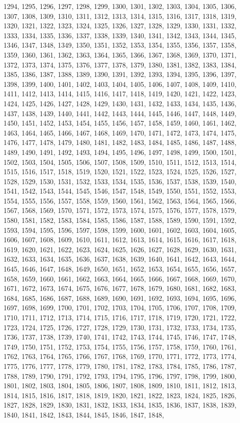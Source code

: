 \documentclass{article}
\begin{document}
{1294, 1295, 1296, 1297, 1298, 1299, 1300, 1301, 1302, 1303, 1304, 1305, 1306, 1307, 1308, 1309, 1310, 1311, 1312, 1313, 1314, 1315, 1316, 1317, 1318, 1319, 1320, 1321, 1322, 1323, 1324, 1325, 1326, 1327, 1328, 1329, 1330, 1331, 1332, 1333, 1334, 1335, 1336, 1337, 1338, 1339, 1340, 1341, 1342, 1343, 1344, 1345, 1346, 1347, 1348, 1349, 1350, 1351, 1352, 1353, 1354, 1355, 1356, 1357, 1358, 1359, 1360, 1361, 1362, 1363, 1364, 1365, 1366, 1367, 1368, 1369, 1370, 1371, 1372, 1373, 1374, 1375, 1376, 1377, 1378, 1379, 1380, 1381, 1382, 1383, 1384, 1385, 1386, 1387, 1388, 1389, 1390, 1391, 1392, 1393, 1394, 1395, 1396, 1397, 1398, 1399, 1400, 1401, 1402, 1403, 1404, 1405, 1406, 1407, 1408, 1409, 1410, 1411, 1412, 1413, 1414, 1415, 1416, 1417, 1418, 1419, 1420, 1421, 1422, 1423, 1424, 1425, 1426, 1427, 1428, 1429, 1430, 1431, 1432, 1433, 1434, 1435, 1436, 1437, 1438, 1439, 1440, 1441, 1442, 1443, 1444, 1445, 1446, 1447, 1448, 1449, 1450, 1451, 1452, 1453, 1454, 1455, 1456, 1457, 1458, 1459, 1460, 1461, 1462, 1463, 1464, 1465, 1466, 1467, 1468, 1469, 1470, 1471, 1472, 1473, 1474, 1475, 1476, 1477, 1478, 1479, 1480, 1481, 1482, 1483, 1484, 1485, 1486, 1487, 1488, 1489, 1490, 1491, 1492, 1493, 1494, 1495, 1496, 1497, 1498, 1499, 1500, 1501, 1502, 1503, 1504, 1505, 1506, 1507, 1508, 1509, 1510, 1511, 1512, 1513, 1514, 1515, 1516, 1517, 1518, 1519, 1520, 1521, 1522, 1523, 1524, 1525, 1526, 1527, 1528, 1529, 1530, 1531, 1532, 1533, 1534, 1535, 1536, 1537, 1538, 1539, 1540, 1541, 1542, 1543, 1544, 1545, 1546, 1547, 1548, 1549, 1550, 1551, 1552, 1553, 1554, 1555, 1556, 1557, 1558, 1559, 1560, 1561, 1562, 1563, 1564, 1565, 1566, 1567, 1568, 1569, 1570, 1571, 1572, 1573, 1574, 1575, 1576, 1577, 1578, 1579, 1580, 1581, 1582, 1583, 1584, 1585, 1586, 1587, 1588, 1589, 1590, 1591, 1592, 1593, 1594, 1595, 1596, 1597, 1598, 1599, 1600, 1601, 1602, 1603, 1604, 1605, 1606, 1607, 1608, 1609, 1610, 1611, 1612, 1613, 1614, 1615, 1616, 1617, 1618, 1619, 1620, 1621, 1622, 1623, 1624, 1625, 1626, 1627, 1628, 1629, 1630, 1631, 1632, 1633, 1634, 1635, 1636, 1637, 1638, 1639, 1640, 1641, 1642, 1643, 1644, 1645, 1646, 1647, 1648, 1649, 1650, 1651, 1652, 1653, 1654, 1655, 1656, 1657, 1658, 1659, 1660, 1661, 1662, 1663, 1664, 1665, 1666, 1667, 1668, 1669, 1670, 1671, 1672, 1673, 1674, 1675, 1676, 1677, 1678, 1679, 1680, 1681, 1682, 1683, 1684, 1685, 1686, 1687, 1688, 1689, 1690, 1691, 1692, 1693, 1694, 1695, 1696, 1697, 1698, 1699, 1700, 1701, 1702, 1703, 1704, 1705, 1706, 1707, 1708, 1709, 1710, 1711, 1712, 1713, 1714, 1715, 1716, 1717, 1718, 1719, 1720, 1721, 1722, 1723, 1724, 1725, 1726, 1727, 1728, 1729, 1730, 1731, 1732, 1733, 1734, 1735, 1736, 1737, 1738, 1739, 1740, 1741, 1742, 1743, 1744, 1745, 1746, 1747, 1748, 1749, 1750, 1751, 1752, 1753, 1754, 1755, 1756, 1757, 1758, 1759, 1760, 1761, 1762, 1763, 1764, 1765, 1766, 1767, 1768, 1769, 1770, 1771, 1772, 1773, 1774, 1775, 1776, 1777, 1778, 1779, 1780, 1781, 1782, 1783, 1784, 1785, 1786, 1787, 1788, 1789, 1790, 1791, 1792, 1793, 1794, 1795, 1796, 1797, 1798, 1799, 1800, 1801, 1802, 1803, 1804, 1805, 1806, 1807, 1808, 1809, 1810, 1811, 1812, 1813, 1814, 1815, 1816, 1817, 1818, 1819, 1820, 1821, 1822, 1823, 1824, 1825, 1826, 1827, 1828, 1829, 1830, 1831, 1832, 1833, 1834, 1835, 1836, 1837, 1838, 1839, 1840, 1841, 1842, 1843, 1844, 1845, 1846, 1847, 1848, }
\end{document}
